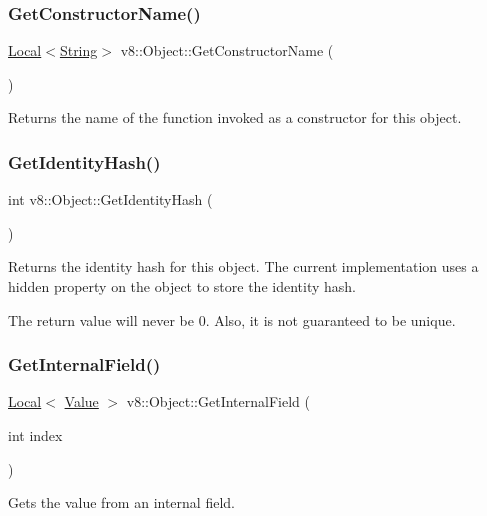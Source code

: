 \subsubsection{\texorpdfstring{Get\+Constructor\+Name()}{GetConstructorName()}}
{\footnotesize\ttfamily \mbox{\hyperlink{classv8_1_1Local}{Local}}$<$\mbox{\hyperlink{classv8_1_1String}{String}}$>$ v8\+::\+Object\+::\+Get\+Constructor\+Name (\begin{DoxyParamCaption}{ }\end{DoxyParamCaption})}

Returns the name of the function invoked as a constructor for this object. \mbox{\label{classv8_1_1Object_ac1ece41e81a499920ec3a2a3471653bc}} 
\subsubsection{\texorpdfstring{Get\+Identity\+Hash()}{GetIdentityHash()}}
{\footnotesize\ttfamily int v8\+::\+Object\+::\+Get\+Identity\+Hash (\begin{DoxyParamCaption}{ }\end{DoxyParamCaption})}

Returns the identity hash for this object. The current implementation uses a hidden property on the object to store the identity hash.

The return value will never be 0. Also, it is not guaranteed to be unique. \mbox{\label{classv8_1_1Object_aa3324fdf652d8ac3b2f27faa0559231d}} 
\subsubsection{\texorpdfstring{Get\+Internal\+Field()}{GetInternalField()}}
{\footnotesize\ttfamily \mbox{\hyperlink{classv8_1_1Local}{Local}}$<$ \mbox{\hyperlink{classv8_1_1Value}{Value}} $>$ v8\+::\+Object\+::\+Get\+Internal\+Field (\begin{DoxyParamCaption}\item[{int}]{index }\end{DoxyParamCaption})}

Gets the value from an internal field. \mbox{\label{classv8_1_1Object_ab991b53d50ab3ce53179e927e52b24f5}} 
